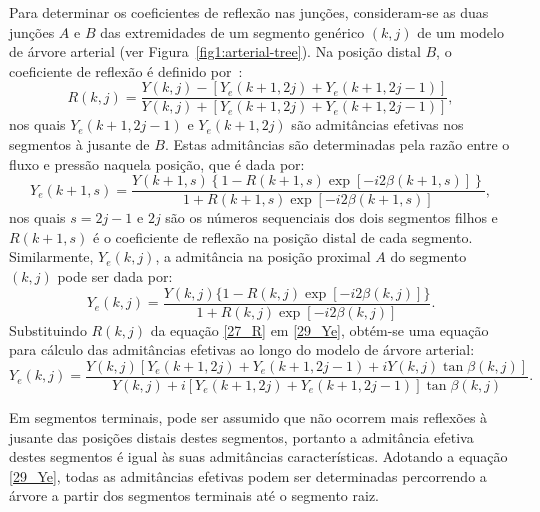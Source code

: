 \documentclass[
        english,			
        brazil			        %
        ,<...>]{abntbibufjf}
\begin{document}
Para determinar os coeficientes de reflexão nas junções, consideram-se as duas junções $A$ e $B$ das extremidades de um segmento genérico $(k,j)$ de um modelo de árvore arterial (ver Figura~\ref{fig1:arterial-tree}). Na posição distal $B$, o coeficiente de reflexão é definido por~\cite{Fung,Lighthill}:
\begin{equation}
R(k,j) = \frac{Y(k,j) - [Y_e(k+1,2j) + Y_e(k+1,2j-1)]}{Y(k,j) + [Y_e(k+1,2j) + Y_e(k+1,2j-1)]},
\label{27_R}
\end{equation}
nos quais $Y_e(k+1,2j-1)$ e $Y_e(k+1,2j)$ são admitâncias efetivas nos segmentos à jusante de $B$. Estas admitâncias são determinadas pela razão entre o fluxo e pressão naquela posição, que é dada por:
\begin{equation}
Y_e(k+1,s) = \frac{Y(k+1,s)\left\{1 - R(k+1,s)\exp{[-i2\beta(k+1,s)]}\right\}}{1 + R(k+1,s)\exp{[-i2\beta(k+1,s)]}},
\label{28_Ye}
\end{equation}
nos quais $s = 2j-1$ e $2j$ são os números sequenciais dos dois segmentos filhos e $R(k+1,s)$ é o coeficiente de reflexão na posição distal de cada segmento. Similarmente, $Y_e(k,j)$, a admitância na posição proximal $A$ do segmento $(k,j)$ pode ser dada por:
\begin{equation}
Y_e(k,j) = \frac{Y(k,j)\{1 - R(k,j)\exp{[-i2\beta(k,j)]}\} }{1 + R(k,j)\exp{[-i2\beta(k,j)]}}
\label{29_Ye}.
\end{equation}
Substituindo $R(k,j)$ da equação \eqref{27_R} em \eqref{29_Ye}, obtém-se  uma equação para cálculo das admitâncias efetivas ao longo do modelo de árvore arterial:
\begin{equation}
Y_e(k,j) = \frac{Y(k,j) [Y_e(k+1,2j) + Y_e(k+1,2j-1)+ i Y(k,j)\tan{\beta(k,j)}]}{Y(k,j) + i[Y_e(k+1,2j) + Y_e(k+1,2j-1)]\tan{\beta(k,j)}}.
\label{30_Ye}
\end{equation}

Em segmentos terminais, pode ser assumido que não ocorrem mais reflexões à jusante das posições distais destes segmentos, portanto a admitância efetiva destes segmentos é igual às suas admitâncias características. Adotando a equação \eqref{29_Ye}, todas as admitâncias efetivas podem ser determinadas percorrendo a árvore a partir dos segmentos terminais até o segmento raiz.

\end{document}

